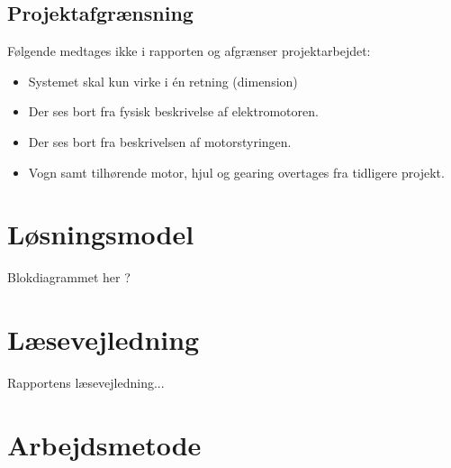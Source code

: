 \subsection{Projektafgrænsning}
Følgende medtages ikke i rapporten og afgrænser projektarbejdet:
\begin{itemize}
\item Systemet skal kun virke i én retning (dimension)
\item Der ses bort fra fysisk beskrivelse af elektromotoren.
\item Der ses bort fra beskrivelsen af motorstyringen.
\item Vogn samt tilhørende motor, hjul og gearing overtages fra tidligere projekt.
\end{itemize}

\section{Løsningsmodel}
Blokdiagrammet her ?

\section{Læsevejledning}
Rapportens læsevejledning...

\section{Arbejdsmetode}





